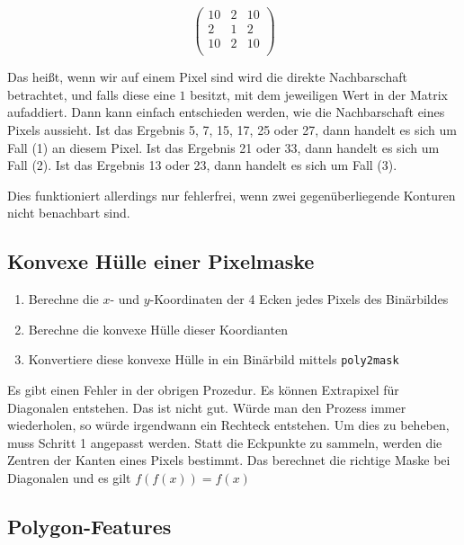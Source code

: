 \begin{equation}
  \begin{pmatrix}
    10 & 2 & 10\\
    2 & 1 & 2\\
    10 & 2 & 10\\
  \end{pmatrix}
\end{equation}

Das heißt, wenn wir auf einem Pixel sind wird die direkte Nachbarschaft betrachtet, und falls diese eine $1$ besitzt, mit dem jeweiligen Wert in der Matrix aufaddiert.
Dann kann einfach entschieden werden, wie die Nachbarschaft eines Pixels aussieht.
Ist das Ergebnis 5, 7, 15, 17, 25 oder 27, dann handelt es sich um Fall (1) an diesem Pixel.
Ist das Ergebnis 21 oder 33, dann handelt es sich um Fall (2).
Ist das Ergebnis 13 oder 23, dann handelt es sich um Fall (3).

Dies funktioniert allerdings nur fehlerfrei, wenn zwei gegenüberliegende Konturen nicht benachbart sind.

\subsection{Konvexe Hülle einer Pixelmaske}

\begin{enumerate}
  \item Berechne die $x$- und $y$-Koordinaten der 4 Ecken jedes Pixels des Binärbildes
  \item Berechne die konvexe Hülle dieser Koordianten
  \item Konvertiere diese konvexe Hülle in ein Binärbild mittels \texttt{poly2mask}
\end{enumerate}

Es gibt einen Fehler in der obrigen Prozedur.
Es können Extrapixel für Diagonalen entstehen.
Das ist nicht gut.
Würde man den Prozess immer wiederholen, so würde irgendwann ein Rechteck entstehen.
Um dies zu beheben, muss Schritt 1 angepasst werden.
Statt die Eckpunkte zu sammeln, werden die Zentren der Kanten eines Pixels bestimmt.
Das berechnet die richtige Maske bei Diagonalen und es gilt $f(f(x)) = f(x)$ 

\subsection{Polygon-Features}

